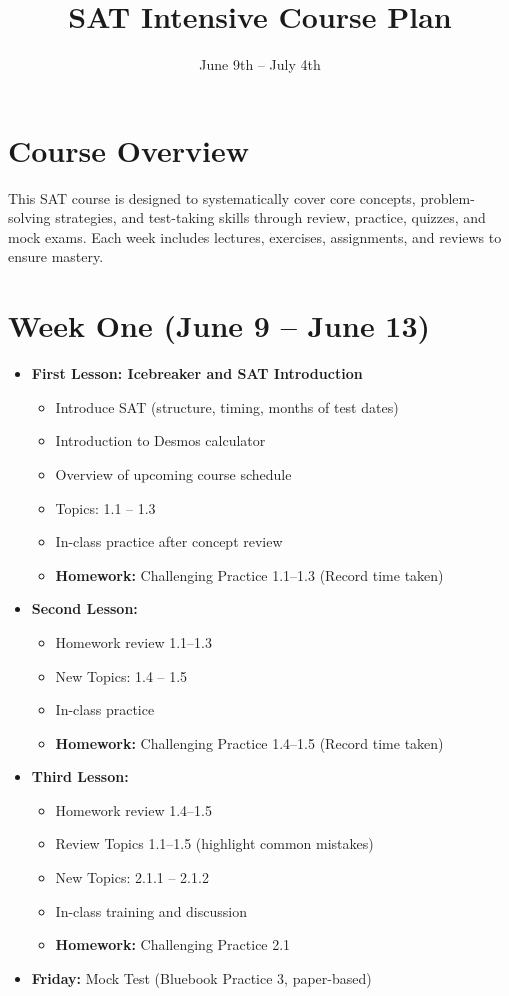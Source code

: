 \documentclass{article}
\title{SAT Intensive Course Plan}
\author{}
\date{June 9th -- July 4th}
\begin{document}
\maketitle

\section*{Course Overview}
This SAT course is designed to systematically cover core concepts, problem-solving strategies, and test-taking skills through review, practice, quizzes, and mock exams. Each week includes lectures, exercises, assignments, and reviews to ensure mastery.

\section*{Week One (June 9 -- June 13)}

\begin{itemize}[leftmargin=*]
    \item \textbf{First Lesson: Icebreaker and SAT Introduction}
    \begin{itemize}
        \item Introduce SAT (structure, timing, months of test dates)
        \item Introduction to Desmos calculator
        \item Overview of upcoming course schedule
        \item Topics: 1.1 -- 1.3
        \item In-class practice after concept review
        \item \textbf{Homework:} Challenging Practice 1.1--1.3 (Record time taken)
    \end{itemize}
    \item \textbf{Second Lesson:}
    \begin{itemize}
        \item Homework review 1.1--1.3
        \item New Topics: 1.4 -- 1.5
        \item In-class practice
        \item \textbf{Homework:} Challenging Practice 1.4--1.5 (Record time taken)
    \end{itemize}
    \item \textbf{Third Lesson:}
    \begin{itemize}
        \item Homework review 1.4--1.5
        \item Review Topics 1.1--1.5 (highlight common mistakes)
        \item New Topics: 2.1.1 -- 2.1.2
        \item In-class training and discussion
        \item \textbf{Homework:} Challenging Practice 2.1
    \end{itemize}
    \item \textbf{Friday:} Mock Test (Bluebook Practice 3, paper-based)
\end{itemize}
\end{document}
